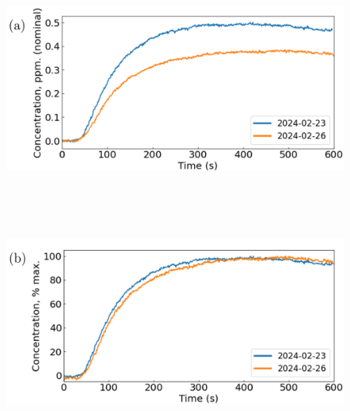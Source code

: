 \documentclass[
  a4paper,
]{scrbook}
\begin{document}
\begin{figure}

\begin{minipage}[t]{0.15\linewidth}

{\centering 

~

}

\end{minipage}%
%
\begin{minipage}[t]{0.70\linewidth}

{\centering 

\includegraphics{figures/ch5/240223_240226_comparison_unnormalised_edited.png}
{}

}

\end{minipage}%
%
\begin{minipage}[t]{0.15\linewidth}

{\centering 

~

}

\end{minipage}%
\newline
\begin{minipage}[t]{0.15\linewidth}

{\centering 

~

}

\end{minipage}%
%
\begin{minipage}[t]{0.70\linewidth}

{\centering 

\includegraphics{figures/ch5/240223_240226_comparison_edited.png} {}

}
\end{minipage}
\end{figure}
\end{document}
